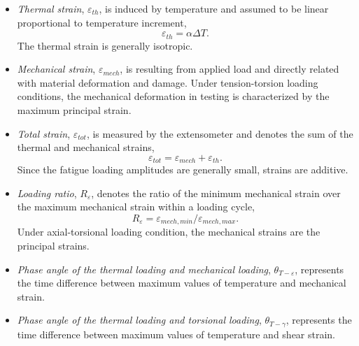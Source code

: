 \begin{itemize}
  \item {\em Thermal strain}, $\varepsilon_{th}$, is induced by temperature and assumed to be linear proportional to temperature increment,
  \begin{equation}
  \varepsilon_{th}=\alpha\Delta T.
  \label{Equ:thermal_strain}
  \end{equation}
  The thermal strain is generally isotropic.
  \item {\em Mechanical strain}, $\varepsilon_{mech}$, is resulting from applied load and directly related with material deformation and damage. Under tension-torsion loading conditions, the mechanical deformation in testing is characterized by the maximum principal strain.
  \item {\em Total strain}, $\varepsilon_{tot}$, is measured by the extensometer and denotes the sum of the thermal and mechanical strains,
  \begin{equation}
  \varepsilon_{tot}=\varepsilon_{mech}+\varepsilon_{th}.
  \label{Equ:total_strain}
  \end{equation}
  Since the fatigue loading amplitudes are generally small, strains are additive.
  \item {\em Loading ratio}, $R_{\varepsilon}$, denotes the ratio of the minimum mechanical strain over the maximum mechanical strain within a loading cycle,
  \begin{equation}
  R_{\varepsilon}=\varepsilon_{mech,min}/\varepsilon_{mech,max}.
  \end{equation}
  Under axial-torsional loading condition, the mechanical strains are the principal strains.
  \item {\em Phase angle of the thermal loading and mechanical loading}, $\theta_{T-\varepsilon}$, represents the time difference between maximum values of temperature and mechanical strain.
  \item {\em Phase angle of the thermal loading and torsional loading}, $\theta_{T-\gamma}$, represents the time difference between maximum values of temperature and shear strain.

\end{itemize}
